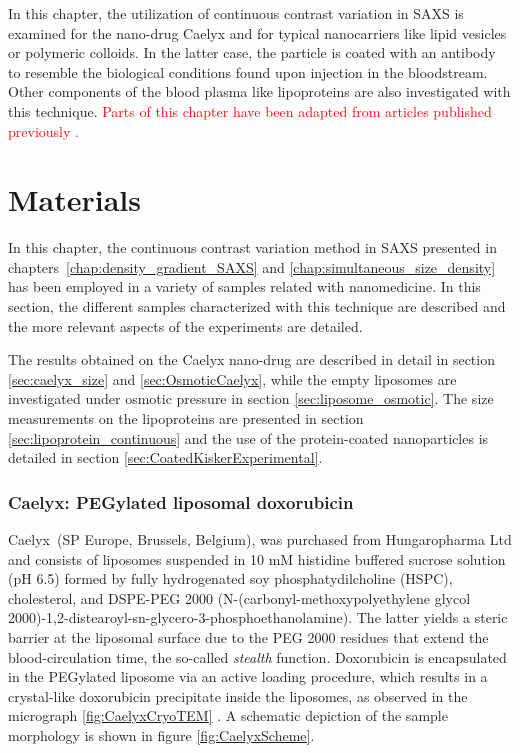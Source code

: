 In this chapter, the utilization of continuous contrast variation in SAXS is examined for the nano-drug Caelyx and for typical nanocarriers like lipid vesicles or polymeric colloids. In the latter case, the particle is coated with an antibody to resemble the biological conditions found upon injection in the bloodstream. Other components of the blood plasma like lipoproteins are also investigated with this technique. \textcolor{red}{Parts of this chapter have been adapted from articles published previously \citep{minelli_characterization_2014,garcia-diez_size_2016}.}


\section{Materials}

In this chapter, the continuous contrast variation method in SAXS presented in chapters~\ref{chap:density_gradient_SAXS} and \ref{chap:simultaneous_size_density} has been employed in a variety of samples related with nanomedicine. In this section, the different samples characterized with this technique are described and the more relevant aspects of the experiments are detailed. 

The results obtained on the Caelyx nano-drug are described in detail in section \ref{sec:caelyx_size} and \ref{sec:OsmoticCaelyx}, while the empty liposomes are investigated under osmotic pressure in section \ref{sec:liposome_osmotic}. The size measurements on the lipoproteins are presented in section \ref{sec:lipoprotein_continuous} and the use of the protein-coated nanoparticles is detailed in section \ref{sec:CoatedKiskerExperimental}.

\subsubsection{Caelyx: PEGylated liposomal doxorubicin}
\label{sec:materials_caelyx}
Caelyx\textregistered\ (SP Europe, Brussels, Belgium), was purchased from Hungaropharma Ltd and consists of liposomes suspended in 10 mM histidine buffered sucrose solution (pH 6.5) formed by fully hydrogenated soy phosphatydilcholine (HSPC), cholesterol, and DSPE-PEG 2000 (N-(carbonyl-methoxypolyethylene glycol 2000)-1,2-distearoyl-sn-glycero-3-phosphoethanolamine). The latter yields a steric barrier at the liposomal surface due to the PEG 2000 residues that extend the blood-circulation time, the so-called \emph{stealth} function. Doxorubicin is encapsulated in the PEGylated liposome via an active loading procedure, which results in a crystal-like doxorubicin precipitate inside the liposomes, as observed in the micrograph \ref{fig:CaelyxCryoTEM} \citep{barenholz_doxil-first_2012}. A schematic depiction of the sample morphology is shown in figure \ref{fig:CaelyxScheme}.

